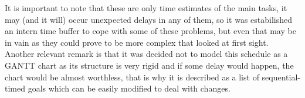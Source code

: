 It is important to note that these are only time estimates of the main tasks, it
may (and it will) occur unexpected delays in any of them, so it was
estabilished an intern time buffer to cope with some of these problems, but even
that may be in vain as they could prove to be more complex that looked at first
sight. Another relevant remark is that it was decided not to model this schedule
as a GANTT chart as its structure is very rigid and if some delay would happen,
the chart would be almost worthless, that is why it is described as a list of
sequential-timed goals which can be easily modified to deal with changes.
